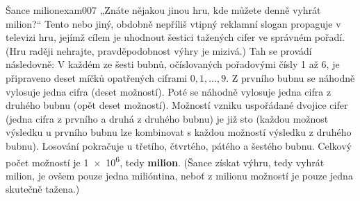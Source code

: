 \begin{mathexam}{{Šance milion}}{exam007}
  „Znáte nějakou jinou hru, kde můžete denně vyhrát milion?“ Tento nebo jiný, obdobně nepříliš
  vtipný reklamní slogan propaguje v televizi hru, jejímž cílem je uhodnout šestici tažených cifer
  ve správném pořadí. (Hru raději nehrajte, pravděpodobnost výhry je mizivá.) Tah se provádí
  následovně: V každém ze šesti bubnů, očíslovaných pořadovými čísly \num{1} až \num{6}, je
  připraveno deset míčků opatřených ciframi \(0, 1, \ldots, 9\). Z prvního bubnu se náhodně vylosuje
  jedna cifra (deset možností). Poté se náhodně vylosuje jedna cifra z druhého bubnu (opět deset
  možností). Možností vzniku uspořádané dvojice cifer (jedna cifra z prvního a druhá z druhého
  bubnu) je již sto (každou možnost výsledku u prvního bubnu lze kombinovat s každou možností
  výsledku z druhého bubnu). Losování pokračuje u třetího, čtvrtého, pátého a šestého bubnu. Celkový
  počet možností je \num{1e6}, tedy \textbf{milion}. (Šance získat výhru, tedy vyhrát milion, je
  ovšem pouze jedna milióntina, neboť z milionu možností je pouze jedna skutečně tažena.) 
\end{mathexam}